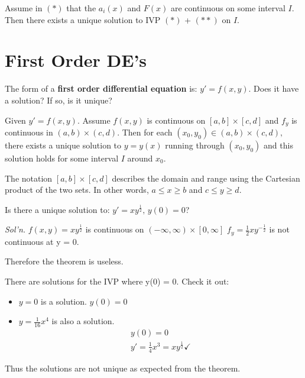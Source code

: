 \documentclass[../main.tex]{subfiles}
\begin{document}
\begin{theorem}[]
    Assume in \( (*) \) that the \(a_{i}(x) \) and \( F(x) \) are continuous on some interval \( I
     \).
    Then there exists a unique solution to IVP \( (*) \) + \( (**) \) on \( I \).
\end{theorem}


\section{First Order DE's}

The form of a \textbf{first order differential equation} is: \( y' = f(x,y) \). Does it have a solution? If so, is it unique?

\begin{theorem}[]
    Given \( y'=f(x,y) \). Assume \( f(x,y) \) is continuous on \( [a,b] \times [c,d] \) and \( f_{y} \) is continuous in \( (a,b) \times (c,d) \).
    Then for each \( (x_0,y_0) \in (a,b) \times (c,d),\, \) there exists a unique solution to \( y=y(x) \) running through \( (x_0,y_0) \) and this solution holds for some interval \( I \) around \( x_0 \).
\end{theorem}

\begin{note}
    The notation \( [a,b] \times [c,d] \) describes the domain and range using the Cartesian product of the two sets. In other words, \(a \leq x \geq b \) and \( c \leq y \geq d \).
\end{note}

\begin{example}[]
    Is there a unique solution to: \( y'=xy^{\frac{1}{2}},\,y(0)=0 \)?

    \textit{Sol'n.}
    \( f(x,y)=xy^{\frac{1}{2}} \) is continuous on \( (-\infty,\infty)\times[0,\infty] \)
    \( f_y = \frac{1}{2}xy^{-\frac{1}{2}} \) is not continuous at y = 0.
    
    Therefore the theorem is useless.

    There are solutions for the IVP where y(0) = 0. Check it out:
    \begin{itemize}[mode=unboxed]
        \item \( y=0 \) is a solution. \( y(0) = 0 \)
        \item \( y=\frac{1}{16}x^4 \) is also a solution.
            \begin{gather*}
                y(0) = 0 \\
                y'=\frac{1}{4}x^3=xy^{\frac{1}{2}} \checkmark
            \end{gather*}
    \end{itemize}
    Thus the solutions are not unique as expected from the theorem.
\end{example}
\end{document}

